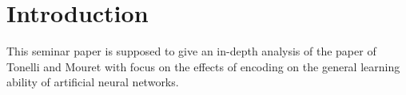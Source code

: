 \documentclass[12pt,twoside]{article}
\theoremstyle{plain}
\theoremstyle{definition}
\theoremstyle{remark}
\begin{document}
\setcounter{tocdepth}{2} 					%
\tableofcontents
{}
\clearpage



\section{Introduction}
\label{sec:introduction}
This seminar paper is supposed to give an in-depth analysis of the paper of Tonelli and Mouret \cite{citeulike:12788284} with focus on the effects of encoding on the general learning ability of artificial neural networks.\medskip
\end{document}
